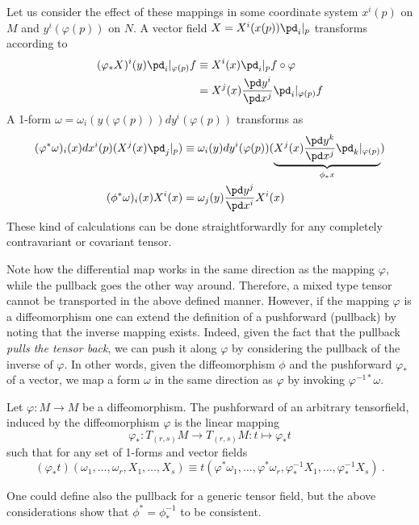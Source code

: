 \documentclass[10pt,reqno]{amsart}
\numberwithin{equation}{section}
\begin{document}
Let us consider the effect of these mappings in some coordinate 
system $x^i(p)$ on $M$ and $y^i(\varphi(p))$ on $N$. A vector 
field $X = X^i(x(p))\pd_i|_p$ transforms according to
%
\begin{displaymath}
	\begin{split}
		(\varphi_\ast X)^i(y)\pd_i|_{\varphi(p)} f &\equiv 
		X^i(x)\pd_i|_p f\circ\varphi \\
		&= X^j(x) \frac{\pd y^i}{\pd x^j} \pd_i|_{\varphi(p)} f
	\end{split}
\end{displaymath}
A 1-form $\omega = \omega_i(y(\varphi(p)))dy^i(\varphi(p))$ 
transforms as
%
\begin{displaymath}
	\begin{split}
		(\varphi^\ast \omega)_i(x)dx^i(p) (X^j(x)\pd_j|_p) &\equiv 
		\omega_i(y) dy^i(\varphi(p)) (\underbrace{X^j(x) \frac{\pd 
				y^k}{\pd x^j} \pd_k|_{\varphi(p)}}_{\phi_\ast x})\\
		(\phi^\ast\omega)_i(x)X^i(x) &= \omega_j(y) \frac{\pd 
			y^j}{\pd x^i} X^i(x)
	\end{split}
\end{displaymath}
%
These kind of calculations can be done straightforwardly for any 
completely contravariant or covariant tensor.

Note how the differential map works in the same direction as the 
mapping $\varphi$, while the pullback goes the other way around.  
Therefore, a mixed type tensor cannot be transported in the above 
defined manner. However, if the mapping $\varphi$ is a 
diffeomorphism one can extend the definition of a pushforward 
(pullback) by noting that the inverse mapping exists. Indeed, 
given the fact that the pullback \emph{pulls the tensor back}, we 
can push it along $\varphi$ by considering the pullback of the 
inverse of $\varphi$. In other words, given the diffeomorphism 
$\phi$ and the pushforward $\varphi_\ast$ of a vector, we map a 
form $\omega$ in the same direction as $\varphi$ by invoking 
$\varphi^{-1\ast} \omega$.

\begin{definition}
Let $\varphi : M \to M$ be a diffeomorphism. The pushforward of 
an arbitrary tensorfield, induced by the diffeomorphism $\varphi$ 
is the linear mapping
\begin{equation}
	\varphi_\ast : T_{(r,s)}M \to T_{(r,s)}M : t \mapsto 
	\varphi_\ast t
\end{equation}
such that for any set of 1-forms and vector fields
\begin{equation}
	(\varphi_\ast t)(\omega_1,\ldots,\omega_r,X_1,\ldots,X_s) 
	\equiv t(\varphi^\ast\omega_1, \ldots, \varphi^\ast\omega_r, 
	\varphi^{-1}_\ast X_1, \ldots, \varphi^{-1}_\ast X_s)~.
\end{equation}
\end{definition}
One could define also the pullback for a generic tensor field, 
but the above considerations show that $\phi^\ast = 
\phi^{-1}_\ast$ to be consistent.
\end{document}
